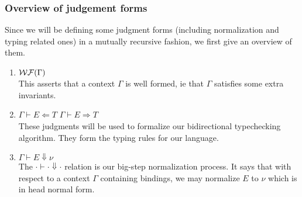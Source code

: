 \documentclass{article}
\begin{document}

\subsubsection{Overview of judgement forms}
Since we will be defining some judgment forms (including normalization and
typing related ones) in a mutually recursive fashion, we first give an
overview of them.

\begin{enumerate}
\item $\operatorname{\mathcal{WF}}(\Gamma)$ \\
  This asserts that a context $\Gamma$ is well formed, ie that $\Gamma$ satisfies
  some extra invariants. 

\item $\Gamma \vdash E \Leftarrow T$ \qquad $\Gamma \vdash E \Rightarrow T$ \\
  These judgments will be used to formalize our bidirectional typechecking
  algorithm. They form the typing rules for our language.

  


\item $\Gamma \vdash E \Downarrow \nu$ \\
  The $\cdot \vdash \cdot \Downarrow \cdot$ relation is our big-step normalization
  process.
  It says that with respect to a context $\Gamma$ containing bindings, we
  may normalize $E$ to $\nu$ which is in head normal form.
\end{enumerate}
\end{document}
